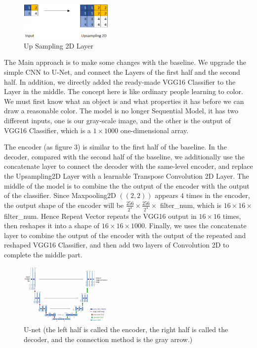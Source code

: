 \documentclass[10pt,twocolumn,letterpaper]{article}
\begin{document}
\begin{figure}[H]
\centering
\includegraphics[width=0.4\textwidth]{fig2}
\caption{Up Sampling 2D Layer} 
\end{figure}

The Main approach is to make some changes with the baseline. We upgrade the simple CNN to U-Net, and connect the Layers of the first half and the second half. In addition, we directly added the ready-made VGG16 Classifier to the Layer in the middle. The concept here is like ordinary people learning to color. We must first know what an object is and what properties it has before we can draw a reasonable color. The model is no longer Sequential Model, it has two different inputs, one is our gray-scale image, and the other is the output of VGG16 Classifier, which is a $1 \times 1000$ one-dimensional array. 

The encoder (as figure 3) is similar to the first half of the baseline. In the decoder, compared with the second half of the baseline, we additionally use the concatenate layer to connect the decoder with the same-level encoder, and replace the Upsampling2D Layer with a learnable Transpose Convolution 2D Layer. The middle of the model is to combine the the output of the encoder with the output of the classifier. Since Maxpooling2D $((2, 2))$ appears $4$ times in the encoder, the output shape of the encoder will be $\frac{256}{2^4} \times \frac{256}{2^4} \times$ filter\_num, which is $16 \times 16 \times$ filter\_num. Hence Repeat Vector repeats the VGG16 output in $16 \times 16$ times, then reshapes it into a shape of $16 \times 16 \times 1000$. Finally, we uses the concatenate layer to combine the output of the encoder with the output of the  repeated and reshaped VGG16 Classifier, and then add two layers of Convolution 2D to complete the middle part.

\begin{figure}[H]
\centering
\includegraphics[width=0.4\textwidth]{fig3}
\caption{U-net (the left half is called the encoder, the right half is called the decoder, and the connection method is the gray arrow.)} 
\end{figure}
\end{document}
